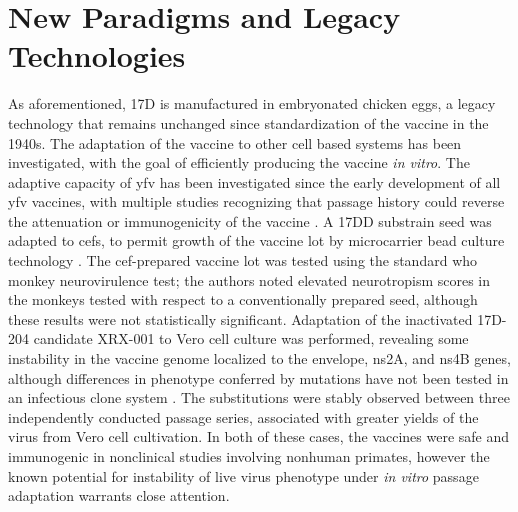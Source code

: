 \section{New Paradigms and Legacy Technologies}
As aforementioned, 17D is manufactured in embryonated chicken eggs, a legacy technology that remains unchanged since standardization of the vaccine in the 1940s. The adaptation of the vaccine to other cell based systems has been investigated, with the goal of efficiently producing the vaccine \emph{in vitro}. The adaptive capacity of \gls{yfv} has been investigated since the early development of all \gls{yfv} vaccines, with multiple studies recognizing that passage history could reverse the attenuation or immunogenicity of the vaccine \parencite{FINDLAY:1935vu,Soper:1938tb}. A 17DD substrain seed was adapted to \glspl{cef}, to permit growth of the vaccine lot by microcarrier bead culture technology \parencite{Freire:2005iw}. The \gls{cef}-prepared vaccine lot was tested using the standard \gls{who} monkey neurovirulence test; the authors noted elevated neurotropism scores in the monkeys tested with respect to a conventionally prepared seed, although these results were not statistically significant. Adaptation of the inactivated 17D-204 candidate XRX-001 to Vero cell culture was performed, revealing some instability in the vaccine genome localized to the envelope, \gls{ns}2A, and \gls{ns}4B genes, although differences in phenotype conferred by mutations have not been tested in an infectious clone system \parencite{Beasley:2013ff}. The substitutions were stably observed between three independently conducted passage series, associated with greater yields of the virus from Vero cell cultivation.  In both of these cases, the vaccines were safe and immunogenic in nonclinical studies involving nonhuman primates, however the known potential for instability of live virus phenotype under \emph{in vitro} passage adaptation warrants close attention.

